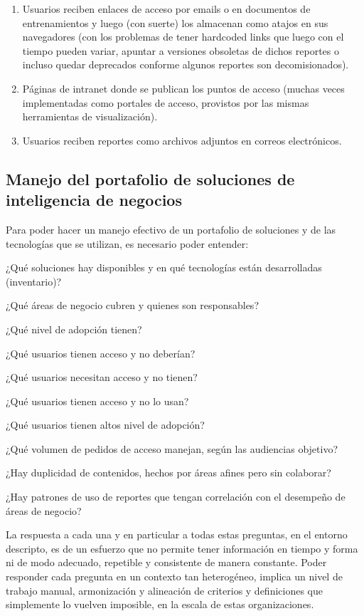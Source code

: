 \begin{enumerate}
    \item Usuarios reciben enlaces de acceso por emails o en documentos de entrenamientos y luego (con suerte) los almacenan como atajos en sus navegadores (con los problemas de tener hardcoded links que luego con el tiempo pueden variar, apuntar a versiones obsoletas de dichos reportes o incluso quedar deprecados conforme algunos reportes son decomisionados).
    \item Páginas de intranet donde se publican los puntos de acceso (muchas veces implementadas como portales de acceso, provistos por las mismas herramientas de visualización).
    \item Usuarios reciben reportes como archivos adjuntos en correos electrónicos.
\end{enumerate}

\subsection{Manejo del portafolio de soluciones de inteligencia de negocios}

Para poder hacer un manejo efectivo de un portafolio de soluciones y de las tecnologías que se utilizan, es necesario poder entender:

¿Qué soluciones hay disponibles y en qué tecnologías están desarrolladas (inventario)?

¿Qué áreas de negocio cubren y quienes son responsables?

¿Qué nivel de adopción tienen?

¿Qué usuarios tienen acceso y no deberían?

¿Qué usuarios necesitan acceso y no tienen?

¿Qué usuarios tienen acceso y no lo usan?

¿Qué usuarios tienen altos nivel de adopción?

¿Qué volumen de pedidos de acceso manejan, según las audiencias objetivo?

¿Hay duplicidad de contenidos, hechos por áreas afines pero sin colaborar?

¿Hay patrones de uso de reportes que tengan correlación con el desempeño de áreas de negocio?

La respuesta a cada una y en particular a todas estas preguntas, en el entorno descripto, es de un esfuerzo que no permite tener información en tiempo y forma ni de modo adecuado, repetible y consistente de manera constante. Poder responder cada pregunta en un contexto tan heterogéneo, implica un nivel de trabajo manual, armonización y alineación de criterios y definiciones que simplemente lo vuelven imposible, en la escala de estas organizaciones.


